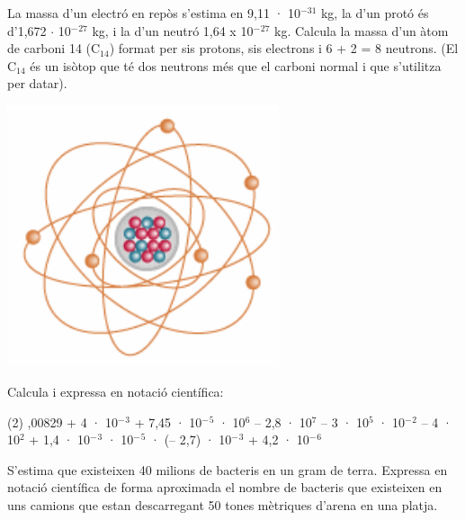 \begin{mylist}
\vspace{-2cm}
\exer[1]  \begin{minipage}[t]{0.7\textwidth}  La massa d'un electró en repòs s'estima en 9,11 · 10${}^{-31}$ kg, la d'un protó és d'1,672 $\cdot$ 10${}^{-}$${}^{27}$ kg, i la d'un neutró 1,64 x 10${}^{-}$${}^{27}$ kg. Calcula la massa d'un àtom de carboni 14 (C${}_{14}$) format per sis protons, sis electrons i 6 + 2 = 8 neutrons. (El C${}_{14}$ és un isòtop que té dos neutrons més que el carboni normal i que s'utilitza per datar).
\end{minipage}
\begin{minipage}{0.3\textwidth}
\centering
\vspace{2cm}
\includegraphics[width=0.6\textwidth]{img-02/carbono14}
\end{minipage}

 
\vspace{3cm}

\exer  Calcula i expressa en notació científica:
\begin{tasks}(2)
 ,00829 + 4 · 10${}^{-}$${}^{3}$ + 7,45 · 10${}^{-}$${}^{5}$       · 10${}^{6}$ -- 2,8 · 10${}^{7}$ -- 3 · 10${}^{5}$
  · 10${}^{-}$${}^{2}$ -- 4 · 10${}^{2}$ + 1,4 · 10${}^{-}$${}^{3}$      · 10${}^{-}$${}^{5 }$ · (-- 2,7) · 10${}^{-}$${}^{3}$ + 4,2 · 10${}^{-}$${}^{6}$
\end{tasks}
 


\exer[1]  S'estima que existeixen 40 milions de bacteris en un gram de terra. Expressa en notació científica de forma aproximada el nombre de bacteris que existeixen en uns camions que estan descarregant 50 tones mètriques d'arena en una platja.


\end{mylist}
